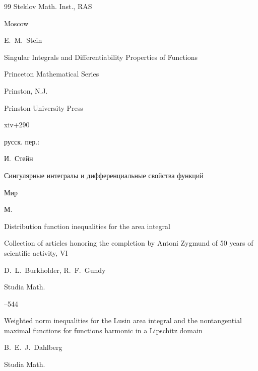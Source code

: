 \begin{thebibliography}{99}
\publ Steklov Math. Inst., RAS

\publaddr Moscow






\by E.~M.~Stein

\book Singular Integrals and Differentiability Properties of Functions

\serial Princeton Mathematical Series


\publaddr Prinston, N.J.

\publ Prinston University Press


\totalpages xiv+290

\rtransl русск. пер.:~

\by И.~Стейн

\book Сингулярные интегралы и дифференциальные свойства функций

\publ Мир

\publaddr М. 










\paper Distribution function inequalities for the area integral

\paperinfo Collection of articles honoring the completion by Antoni Zygmund of 50 years of scientific activity, VI

\by D.~L.~Burkholder,  R.~F.~Gundy 

\jour Studia Math.



--544








\paper Weighted norm inequalities for the Lusin area integral and the nontangential maximal functions for functions harmonic in a Lipschitz domain

\by B.~E.~J.~Dahlberg

\jour Studia Math.





\end{thebibliography}
